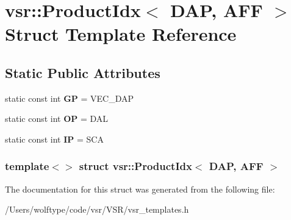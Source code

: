 \hypertarget{structvsr_1_1_product_idx_3_01_d_a_p_00_01_a_f_f_01_4}{\section{vsr\-:\-:Product\-Idx$<$ D\-A\-P, A\-F\-F $>$ Struct Template Reference}
\label{structvsr_1_1_product_idx_3_01_d_a_p_00_01_a_f_f_01_4}
}
\subsection*{Static Public Attributes}
\begin{DoxyCompactItemize}
\item 
\hypertarget{structvsr_1_1_product_idx_3_01_d_a_p_00_01_a_f_f_01_4_ac7a6ce2fa3d6b9ccc49210dce9776a1b}{static const int {\bfseries G\-P} = V\-E\-C\-\_\-\-D\-A\-P}\label{structvsr_1_1_product_idx_3_01_d_a_p_00_01_a_f_f_01_4_ac7a6ce2fa3d6b9ccc49210dce9776a1b}

\item 
\hypertarget{structvsr_1_1_product_idx_3_01_d_a_p_00_01_a_f_f_01_4_a3357112a421f0da2a177a237344ae124}{static const int {\bfseries O\-P} = D\-A\-L}\label{structvsr_1_1_product_idx_3_01_d_a_p_00_01_a_f_f_01_4_a3357112a421f0da2a177a237344ae124}

\item 
\hypertarget{structvsr_1_1_product_idx_3_01_d_a_p_00_01_a_f_f_01_4_a95907975a2db3905f05b9ed64cd7b707}{static const int {\bfseries I\-P} = S\-C\-A}\label{structvsr_1_1_product_idx_3_01_d_a_p_00_01_a_f_f_01_4_a95907975a2db3905f05b9ed64cd7b707}

\end{DoxyCompactItemize}
\subsubsection*{template$<$$>$ struct vsr\-::\-Product\-Idx$<$ D\-A\-P, A\-F\-F $>$}



The documentation for this struct was generated from the following file\-:\begin{DoxyCompactItemize}
\item 
/\-Users/wolftype/code/vsr/\-V\-S\-R/vsr\-\_\-templates.\-h\end{DoxyCompactItemize}
